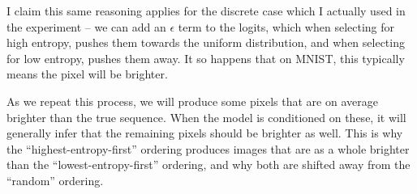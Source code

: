 I claim this same reasoning applies for the discrete case which I actually used in the experiment -- we can add an $\epsilon$ term to the logits, which when selecting for high entropy, pushes them towards the uniform distribution, and when selecting for low entropy, pushes them away. It so happens that on MNIST, this typically means the pixel will be brighter.

As we repeat this process, we will produce some pixels that are on average brighter than the true sequence. When the model is conditioned on these, it will generally infer that the remaining pixels should be brighter as well. This is why the ``highest-entropy-first'' ordering produces images that are as a whole brighter than the ``lowest-entropy-first'' ordering, and why both are shifted away from the ``random'' ordering.